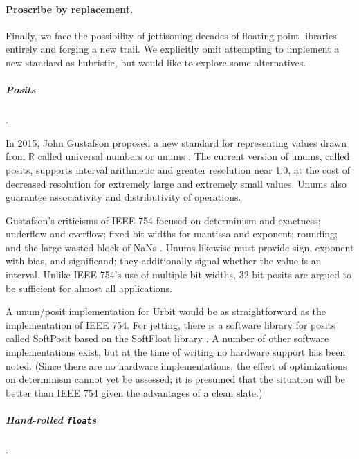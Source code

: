\documentclass[twoside]{article}
\begin{document}
\paragraph{Proscribe by replacement.}

Finally, we face the possibility of jettisoning decades of floating-point libraries entirely and forging a new trail.  We explicitly omit attempting to implement a new standard as hubristic, but would like to explore some alternatives.

\subparagraph{Posits}.

In 2015, John Gustafson proposed a new standard for representing values drawn from $\mathbb{R}$ called universal numbers or unums \citep{Gustafson2015, Gustafson2017, Posit2022}.  The current version of unums, called posits, supports interval arithmetic and greater resolution near 1.0, at the cost of decreased resolution for extremely large and extremely small values.  Unums also guarantee associativity and distributivity of operations.

Gustafson's criticisms of IEEE 754 focused on determinism and exactness; underflow and overflow; fixed bit widths for mantissa and exponent; rounding; and the large wasted block of NaNs \citep{Risse2016}.  Unums likewise must provide sign, exponent with bias, and significand; they additionally signal whether the value is an interval.  Unlike IEEE 754's use of multiple bit widths, 32-bit posits are argued to be sufficient for almost all applications.

\citep{Gustafson2015}
\citep{Gustafson2017}
\citep{Posit2022}
\citep{Risse2016}

A unum/posit implementation for Urbit would be as straightforward as the implementation of IEEE 754.  For jetting, there is a software library for posits called SoftPosit based on the SoftFloat library \citep{Cerlane2018}.  A number of other software implementations exist, but at the time of writing no hardware support has been noted.  (Since there are no hardware implementations, the effect of optimizations on determinism cannot yet be assessed; it is presumed that the situation will be better than IEEE 754 given the advantages of a clean slate.)

\subparagraph{Hand-rolled \texttt{float}s}.
\end{document}

